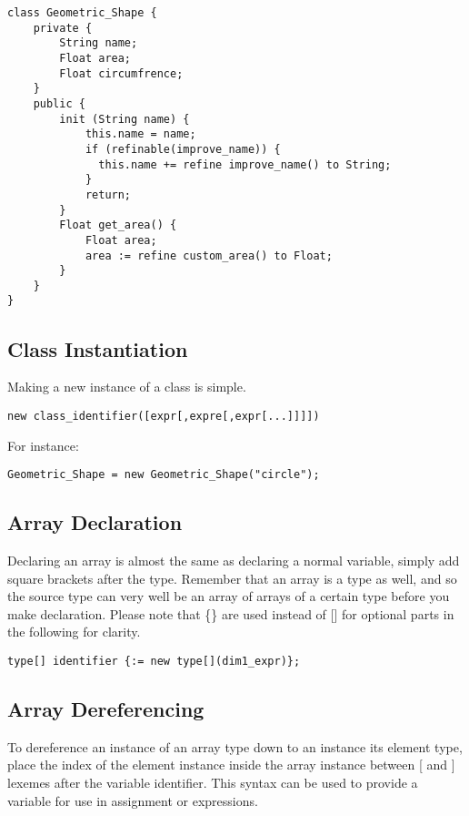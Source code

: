 \begin{lstlisting}[label=Method Invocation,caption=Class Declaration for a Geometric Shape class]
class Geometric_Shape {
    private {
        String name;
        Float area;
        Float circumfrence;
    }
    public {
        init (String name) {
            this.name = name;
            if (refinable(improve_name)) {
              this.name += refine improve_name() to String;
            }
            return;
        }
        Float get_area() {
            Float area;
            area := refine custom_area() to Float;
        }
    }
}
\end{lstlisting}

\subsection{Class Instantiation}
Making a new instance of a class is simple.

\begin{lstlisting}
new class_identifier([expr[,expre[,expr[...]]]])
\end{lstlisting}

For instance:

\begin{lstlisting}[label=Method Invocation,caption=Class Instantiation for a Geometric Shape class]
Geometric_Shape = new Geometric_Shape("circle");
\end{lstlisting}

\subsection{Array Declaration}
Declaring an array is almost the same as declaring a normal variable, simply add square brackets after the type. Remember that an array is a type as well, and so the source type can very well be an array of arrays of a certain type before you make declaration. Please note that \{\} are used instead of [] for optional parts in the following for clarity.

\begin{lstlisting}
type[] identifier {:= new type[](dim1_expr)};
\end{lstlisting}

\subsection{Array Dereferencing}
To dereference an instance of an array type down to an instance its element type, place the index of the element instance inside the array instance between [ and ] lexemes after the variable identifier. This syntax can be used to provide a variable for use in assignment or expressions.

